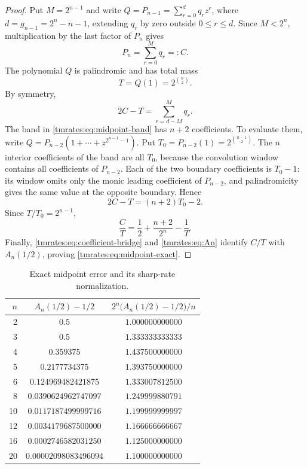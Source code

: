 \documentclass[11pt,oneside]{article}
\theoremstyle{definition}
\theoremstyle{remark}
\begin{document}
\begin{proof}
Put $M=2^{n-1}$ and write $Q=P_{n-1}=\sum_{r=0}^{d}q_rz^r$, where
$d=g_{n-1}=2^n-n-1$, extending $q_r$ by zero outside $0\le r\le d$.  Since $M<2^n$,
multiplication by the last factor of $P_n$ gives
\begin{equation}
 [z^M]P_n=\sum_{r=0}^{M}q_r=:C.                            \label{tmrates:eq:midpoint-C}
\end{equation}
The polynomial $Q$ is palindromic and has total mass
\begin{equation}
 T=Q(1)=2^{\binom n2}.                                     \label{tmrates:eq:midpoint-T}
\end{equation}
By symmetry,
\begin{equation}
 2C-T=\sum_{r=d-M}^{M}q_r.                                 \label{tmrates:eq:midpoint-band}
\end{equation}
The band in \eqref{tmrates:eq:midpoint-band} has $n+2$ coefficients.  To evaluate them, write
$Q=P_{n-2}(1+\cdots+z^{2^{n-1}-1})$.  Put
$T_0=P_{n-2}(1)=2^{\binom{n-1}{2}}$.  The $n$ interior coefficients of the band are all
$T_0$, because the convolution window contains all coefficients of $P_{n-2}$.  Each of the
two boundary coefficients is $T_0-1$: its window omits only the monic leading coefficient of
$P_{n-2}$, and palindromicity gives the same value at the opposite boundary.  Hence
\begin{equation}
 2C-T=(n+2)T_0-2.                                         \label{tmrates:eq:midpoint-band-value}
\end{equation}
Since $T/T_0=2^{n-1}$,
\[
 \frac CT=\frac12+\frac{n+2}{2^n}-\frac1T.
\]
Finally, \eqref{tmrates:eq:coefficient-bridge} and \eqref{tmrates:eq:An} identify $C/T$ with
$A_n(1/2)$, proving \eqref{tmrates:eq:midpoint-exact}.
\end{proof}

\begin{table}[htbp]
\centering
\caption{Exact midpoint error and its sharp-rate normalization.}
\label{tmrates:tab:midpoint}
\begin{tabular}{@{}rcc@{}}
\toprule
$n$ & $A_n(1/2)-1/2$ & $2^n\bigl(A_n(1/2)-1/2\bigr)/n$\\
\midrule
2  & $0.5$                 & $1.000000000000$\\
3  & $0.5$                 & $1.333333333333$\\
4  & $0.359375$            & $1.437500000000$\\
5  & $0.2177734375$        & $1.393750000000$\\
6  & $0.124969482421875$   & $1.333007812500$\\
8  & $0.0390624962747097$  & $1.249999880791$\\
10 & $0.0117187499999716$  & $1.199999999997$\\
12 & $0.0034179687500000$  & $1.166666666667$\\
16 & $0.0002746582031250$  & $1.125000000000$\\
20 & $0.00002098083496094$ & $1.100000000000$\\
\bottomrule
\end{tabular}
\end{table}
\end{document}
